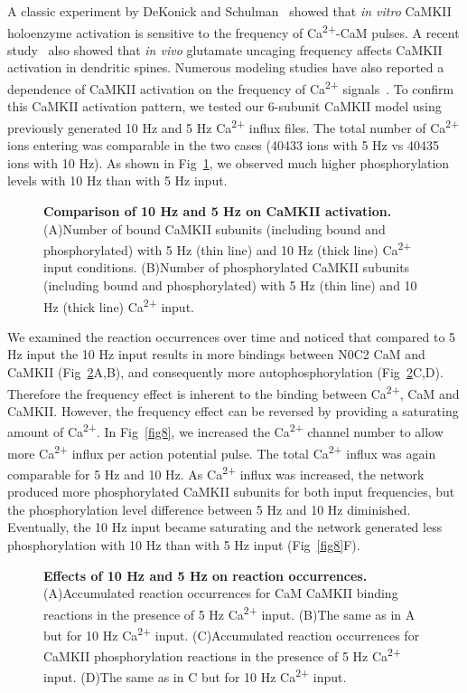 \documentclass[10pt,letterpaper]{article}
\begin{document}
A classic experiment by DeKonick and Schulman~\cite{DeKoninck:1998wh} showed that \textit{in vitro} CaMKII holoenzyme activation is sensitive to the frequency of Ca\textsuperscript{2+}-CaM pulses. A recent study~\cite{Fujii:2013bg} also showed that \textit{in vivo} glutamate uncaging frequency affects CaMKII activation in dendritic spines. Numerous modeling studies have also reported a dependence of CaMKII activation on the frequency of Ca\textsuperscript{2+} signals~\cite{Pepke:2010ju,Dupont:2003vq,Michalski:2012ds,Kubota:2001ul}. To confirm this CaMKII activation pattern, we tested our 6-subunit CaMKII model using previously generated 10 Hz and 5 Hz Ca\textsuperscript{2+} influx files. The total number of Ca\textsuperscript{2+} ions entering was comparable in the two cases (40433 ions with 5 Hz vs 40435 ions with 10 Hz). As shown in Fig~\ref{fig6}, we observed much higher phosphorylation levels with 10 Hz than with 5 Hz input.

\begin{figure}[!h]
	\caption{{\bf Comparison of 10 Hz and 5 Hz on CaMKII activation.}
	(A)Number of bound CaMKII subunits (including bound and phosphorylated) with 5 Hz (thin line) and 10 Hz (thick line) Ca\textsuperscript{2+} input conditions.
	(B)Number of phosphorylated CaMKII subunits (including bound and phosphorylated) with 5 Hz (thin line) and 10 Hz (thick line) Ca\textsuperscript{2+} input.
	}
\label{fig6}
\end{figure}

We examined the reaction occurrences over time and noticed that compared to 5 Hz input the 10 Hz input results in more bindings between N0C2 CaM and CaMKII (Fig~\ref{fig7}A,B), and consequently more autophosphorylation (Fig~\ref{fig7}C,D). Therefore the frequency effect is inherent to the binding between Ca\textsuperscript{2+}, CaM and CaMKII. However, the frequency effect can be reversed by providing a saturating amount of Ca\textsuperscript{2+}. In Fig~\ref{fig8}, we increased the Ca\textsuperscript{2+} channel number to allow more Ca\textsuperscript{2+} influx per action potential pulse. The total Ca\textsuperscript{2+} influx was again comparable for 5 Hz and 10 Hz. As Ca\textsuperscript{2+} influx was increased, the network produced more phosphorylated CaMKII subunits for both input frequencies, but the phosphorylation level difference between 5 Hz and 10 Hz diminished. Eventually, the 10 Hz input became saturating and the network generated less phosphorylation with 10 Hz than with 5 Hz input (Fig~\ref{fig8}F).
\begin{figure}[!h]
	\caption{{\bf Effects of 10 Hz and 5 Hz on reaction occurrences.} 
	(A)Accumulated reaction occurrences for CaM CaMKII binding reactions in the presence of 5 Hz Ca\textsuperscript{2+} input. 
	(B)The same as in A but for 10 Hz Ca\textsuperscript{2+} input.
	(C)Accumulated reaction occurrences for CaMKII phosphorylation reactions in the presence of 5 Hz Ca\textsuperscript{2+} input. 
	(D)The same as in C but for 10 Hz Ca\textsuperscript{2+} input.
	}
\label{fig7}
\end{figure}
\end{document}
